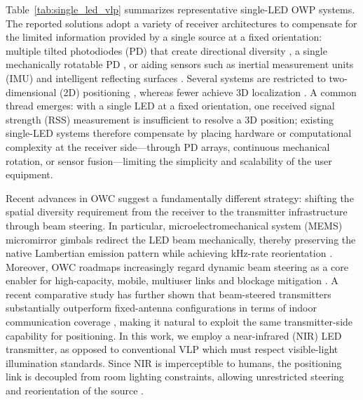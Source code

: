 \documentclass[journal]{IEEEtran}
\newcommand{\added}[1]{{\color{blue}#1}}
\begin{document}
\added{Table~\ref{tab:single_led_vlp} summarizes representative single-LED OWP systems. The reported solutions adopt a variety of receiver architectures to compensate for the limited information provided by a single source at a fixed orientation: multiple tilted photodiodes (PD) that create directional diversity \cite{Qin2020, Qin2021, Zia-Ul-Mustafa2023, Zhang2024, Li2024}, a single mechanically rotatable PD \cite{Liu2022, Wang2024, Shi2025}, or aiding sensors such as inertial measurement units (IMU) \cite{Ma2024} and intelligent reflecting surfaces \cite{ShiJin2025}. Several systems are restricted to two-dimensional (2D) positioning \cite{Chen2021, Qin2021, Liu2022, Zia-Ul-Mustafa2023, Chassagne2025, Zhang2024, Wang2024, Shi2025, ShiJin2025}, whereas fewer achieve 3D localization \cite{Qin2020, Li2024, Ma2024}. A common thread emerges: with a single LED at a fixed orientation, one received signal strength (RSS) measurement is insufficient to resolve a 3D position; existing single-LED systems therefore compensate by placing hardware or computational complexity at the receiver side---through PD arrays, continuous mechanical rotation, or sensor fusion---limiting the simplicity and scalability of the user equipment.}

\added{Recent advances in OWC suggest a fundamentally different strategy: shifting the spatial diversity requirement from the receiver to the transmitter infrastructure through beam steering. In particular, microelectromechanical system (MEMS) micromirror gimbals redirect the LED beam mechanically, thereby preserving the native Lambertian emission pattern while achieving kHz-rate reorientation \cite{Liu:25}. Moreover, OWC roadmaps increasingly regard dynamic beam steering as a core enabler for high-capacity, mobile, multiuser links and blockage mitigation \cite{mi13070990, Zeng2023, Jin2023}. A recent comparative study has further shown that beam-steered transmitters substantially outperform fixed-antenna configurations in terms of indoor communication coverage \cite{AlSatai2026}, making it natural to exploit the same transmitter-side capability for positioning. In this work, we employ a near-infrared (NIR) LED transmitter, as opposed to conventional VLP which must respect visible-light illumination standards. Since NIR is imperceptible to humans, the positioning link is decoupled from room lighting constraints, allowing unrestricted steering and reorientation of the source \cite{Zhu2025}.}
\end{document}
